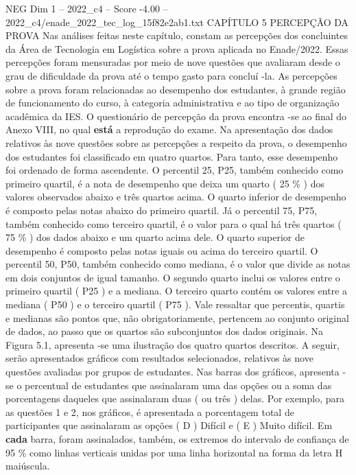 \begin{textsample}{NEG Dim 1 – 2022\_c4 – Score -4.00 – 2022\_c4/enade\_2022\_tec\_log\_15f82e2ab1.txt}  \label{ex:f1_neg_171}
CAPÍTULO 5 PERCEPÇÃO DA PROVA Nas análises feitas neste capítulo, constam as percepções dos concluintes da Área de Tecnologia em Logística sobre a prova aplicada no Enade/2022.
Essas percepções foram mensuradas por meio de nove questões que avaliaram desde o grau de dificuldade da prova até o tempo gasto para concluí -la.
As percepções sobre a prova foram relacionadas ao desempenho dos estudantes, à grande região de funcionamento do curso, à categoria administrativa e ao tipo de organização acadêmica da IES.
O questionário de percepção da prova encontra -se ao final do Anexo VIII, no qual \textbf{está} a reprodução do exame.
Na apresentação dos dados relativos às nove questões sobre as percepções a respeito da prova, o desempenho dos estudantes foi classificado em quatro quartos.
Para tanto, esse desempenho foi ordenado de forma ascendente.
O percentil 25, P25, também conhecido como primeiro quartil, é a nota de desempenho que deixa um quarto ( 25 \% ) dos valores observados abaixo e três quartos acima.
O quarto inferior de desempenho é composto pelas notas abaixo do primeiro quartil.
Já o percentil 75, P75, também conhecido como terceiro quartil, é o valor para o qual há três quartos ( 75 \% ) dos dados abaixo e um quarto acima dele.
O quarto superior de desempenho é composto pelas notas iguais ou acima do terceiro quartil.
O percentil 50, P50, também conhecido como mediana, é o valor que divide as notas em dois conjuntos de igual tamanho.
O segundo quarto inclui os valores entre o primeiro quartil ( P25 ) e a mediana.
O terceiro quarto contém os valores entre a mediana ( P50 ) e o terceiro quartil ( P75 ).
Vale ressaltar que percentis, quartis e medianas são pontos que, não obrigatoriamente, pertencem ao conjunto original de dados, ao passo que os quartos são subconjuntos dos dados originais.
Na Figura 5.1, apresenta -se uma ilustração dos quatro quartos descritos.
A seguir, serão apresentados gráficos com resultados selecionados, relativos às nove questões avaliadas por grupos de estudantes.
Nas barras dos gráficos, apresenta -se o percentual de estudantes que assinalaram uma das opções ou a soma das porcentagens daqueles que assinalaram duas ( ou três ) delas.
Por exemplo, para as questões 1 e 2, nos gráficos, é apresentada a porcentagem total de participantes que assinalaram as opções ( D ) Difícil e ( E ) Muito difícil.
Em \textbf{cada} barra, foram assinalados, também, os extremos do intervalo de confiança de 95 \% como linhas verticais unidas por uma linha horizontal na forma da letra H maiúscula.

\end{textsample}
